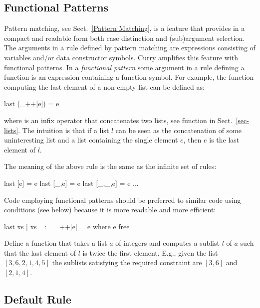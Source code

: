 \subsection{Functional Patterns}
\label{Functional Patterns}

Pattern matching, see Sect.~\ref{Pattern Matching}, is a feature that
provides in a compact and readable form both case distinction
and (sub)argument selection.
The arguments in a rule defined by pattern matching are expressions
consisting of variables and/or data constructor symbols.
Curry amplifies this feature with functional patterns.
In a \emph{functional pattern}
some argument in a rule defining
a function is an expression containing a function symbol.
For example, the function computing the last element
of a non-empty list can be defined as:
%
\begin{curry}
last (_++[e]) = e
\end{curry}
%
where \ccode{++} is an infix operator that concatenates two lists,
see function  in Sect.~\ref{sec-lists}.
The intuition is that if a list $l$ can be seen as the concatenation
of some uninteresting list and a list containing the single element $e$,
then $e$ is the last element of $l$.

The meaning of the above rule is the same as the infinite set of rules:
%
\begin{curry}
last [e] = e
last [_,e] = e
last [_,_,e] = e
...
\end{curry}

\noindent
Code employing functional patterns should be preferred to
similar code using conditions (see below)
because it is more readable and more efficient:
%
\begin{curry}
last xs | xs =:= _++[e] = e  where e free
\end{curry}
%
\begin{exercise}
Define a function that takes a list $a$ of integers and
computes a sublist $l$ of $a$ such that the last element of $l$
is twice the first element.  E.g.,
given the list $[3,6,2,1,4,5]$ the sublists satisfying the
required constraint are $[3,6]$ and $[2,1,4]$.
\end{exercise}

\subsection{Default Rule}
\label{Default Rule}

